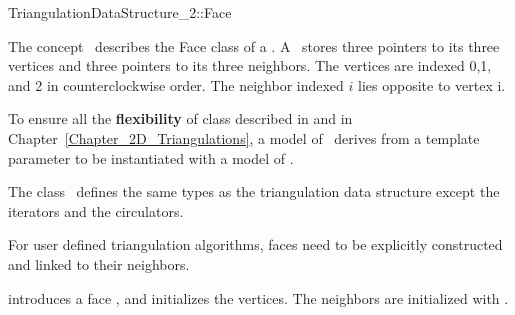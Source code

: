

\begin{ccRefConcept}{TriangulationDataStructure_2::Face}


\ccDefinition
  
The concept \ccRefName\  describes the Face class of a 
.
A \ccRefName\ stores three pointers to its three vertices
and three pointers to its three neighbors.
The vertices are indexed 0,1, and 2 in counterclockwise order.
The  neighbor indexed $i$ lies
opposite to vertex i.

To ensure all the \textbf{flexibility} of class 
described in 
and in Chapter~\ref{Chapter_2D_Triangulations}, a model of 
\ccRefName\ derives from a template parameter
 to be instantiated with a model of 
.

\ccTypes
The class \ccRefName\ defines the same types as 
the triangulation data structure 
except the iterators and the circulators.

\begin{ccAdvanced}
\ccCreation

For user defined triangulation algorithms, faces need to
be explicitly constructed and linked to their neighbors.


{introduces a face \ccVar, and initializes the vertices. The 
neighbors are initialized with .}


\end{ccAdvanced}
\end{ccRefConcept}
